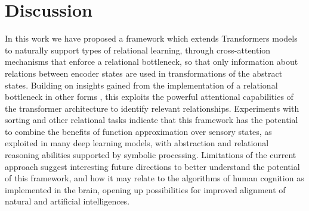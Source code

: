 \section{Discussion}
\label{sec:discuss}



In this work we have proposed a framework which extends Transformers models to 
naturally support types of relational learning, through cross-attention
mechanisms that enforce a relational bottleneck, so that only information about relations between encoder states
are used in transformations of the abstract states.
Building on insights gained from the implementation of a relational bottleneck in other forms \citep{esbn, kerg2022neural}, this exploits the powerful attentional capabilities of the transformer architecture to identify relevant relationships.
Experiments with sorting and other relational tasks indicate that this framework has the potential to combine the
benefits of function approximation over sensory states, as exploited in many deep learning models, with abstraction and relational reasoning abilities
supported by symbolic processing.
Limitations of the current approach suggest interesting
future directions to better understand the potential of this framework, and
how it may relate to the algorithms of human cognition as implemented in the brain, opening up possibilities for 
improved alignment of natural and artificial intelligences.

